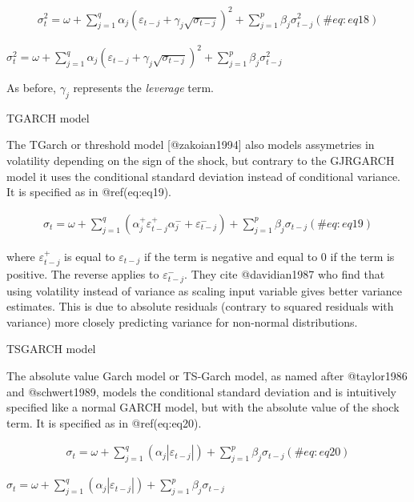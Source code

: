\documentclass[
]{article}
\begin{document}
\begin{align}
\sigma_t^2 = \omega + \sum\limits_{j=1}^q \alpha_j (\varepsilon_{t-j}+ \gamma_j \sqrt{\sigma_{t-j}})^2 + \sum\limits_{j = 1}^p \beta_j \sigma_{t-j}^2
 (\#eq:eq18)
\end{align}

\(\sigma_t^2 = \omega + \sum\limits_{j=1}^q \alpha_j (\varepsilon_{t-j}+ \gamma_j \sqrt{\sigma_{t-j}})^2 + \sum\limits_{j = 1}^p \beta_j \sigma_{t-j}^2\)

As before, \(\gamma_j\) represents the \emph{leverage} term.

TGARCH model

\noindent The TGarch or threshold model {[}@zakoian1994{]} also models
assymetries in volatility depending on the sign of the shock, but
contrary to the GJRGARCH model it uses the conditional standard
deviation instead of conditional variance. It is specified as in
@ref(eq:eq19).

\begin{align}
\sigma_t = \omega + \sum\limits_{j=1}^q (\alpha_j^+ \varepsilon_{t-j}^+ \alpha_j^{-} + \varepsilon_{t-j}^{-}) + \sum\limits_{j = 1}^p \beta_j \sigma_{t-j}
 (\#eq:eq19)
\end{align}

\noindent where \(\varepsilon_{t-j}^+\) is equal to
\(\varepsilon_{t-j}\) if the term is negative and equal to 0 if the term
is positive. The reverse applies to \(\varepsilon_{t-j}^-\). They cite
@davidian1987 who find that using volatility instead of variance as
scaling input variable gives better variance estimates. This is due to
absolute residuals (contrary to squared residuals with variance) more
closely predicting variance for non-normal distributions.

TSGARCH model

\noindent The absolute value Garch model or TS-Garch model, as named
after @taylor1986 and @schwert1989, models the conditional standard
deviation and is intuitively specified like a normal GARCH model, but
with the absolute value of the shock term. It is specified as in
@ref(eq:eq20).

\begin{align}
\sigma_t = \omega + \sum\limits_{j=1}^q (\alpha_j \left|\varepsilon_{t-j}\right|) +
\sum\limits_{j = 1}^p \beta_j \sigma_{t-j}
 (\#eq:eq20)
\end{align}

\newpage

\(\sigma_t = \omega + \sum\limits_{j=1}^q (\alpha_j \left|\varepsilon_{t-j}\right|) +\sum\limits_{j = 1}^p \beta_j \sigma_{t-j}\)
\end{document}

